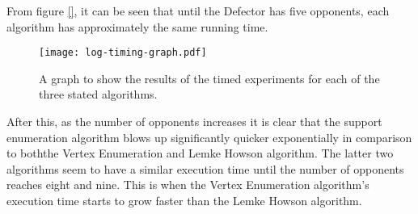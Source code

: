 From figure \ref{}, it can be seen that until the Defector has five opponents,
each algorithm has approximately the same running time. 

\begin{figure}
    \begin{center}
        \texttt{[image: log-timing-graph.pdf]}\label{LogTimingGraph}
        \caption{A graph to show the results of the timed experiments for each of the three stated algorithms.}
    \end{center}
\end{figure}

After this, as the number of opponents increases it is clear that the support
enumeration algorithm blows up significantly quicker exponentially in 
comparison to boththe Vertex Enumeration and Lemke Howson algorithm. The latter 
two algorithms seem to have a similar execution time until the number of
opponents reaches eight and nine. This is when the Vertex Enumeration
algorithm's execution time starts to grow faster than the Lemke Howson algorithm.